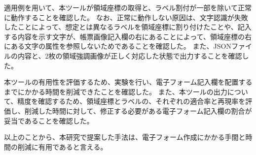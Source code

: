 \documentclass[uplatex, report, a4j, 10pt]{jsbook}
\begin{document}
適用例を用いて、本ツールが領域座標の取得と、ラベル割付が一部を除いて正常に動作することを確認した。
なお、正常に動作しない原因は、文字認識が失敗したことによって、想定とは異なるラベルを領域座標に割り付けたことや、記入する内容を示す文字が、帳票画像記入欄の右にあることによって、領域座標の右にある文字の属性を参照しないためであることを確認した。
また、JSONファイルの内容と、2枚の領域強調画像が正しく対応した状態で出力することを確認した。

本ツールの有用性を評価するため、実験を行い、電子フォーム記入欄を配置するまでにかかる時間を削減できたことを確認した。
また、本ツールの出力について、精度を確認するため、領域座標とラベルの、それぞれの適合率と再現率を評価し、削減した時間に対して、修正する必要がある電子フォーム記入欄の割合が妥当であることを確認した。

以上のことから、本研究で提案した手法は、電子フォーム作成にかかる手間と時間の削減に有用であると言える。

%
%











\end{document}

